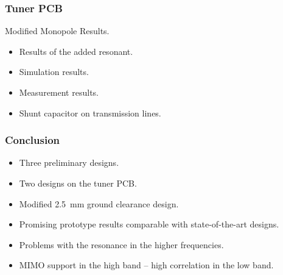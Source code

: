 \begin{frame}
  \frametitle{Tuner PCB}
    \begin{block}{Modified Monopole Results.}
      \begin{itemize}
      \item Results of the added resonant.
      \item Simulation results.
      \item Measurement results.
      \item Shunt capacitor on transmission lines.
      \end{itemize}
    \end{block}
\end{frame}

\begin{frame}
  \frametitle{Conclusion}
      \begin{itemize}
      \item Three preliminary designs.
      \item Two designs on the tuner PCB.
      \item Modified \SI{2.5}{mm} ground clearance design.
    \item Promising prototype results comparable with state-of-the-art designs.
    \item Problems with the resonance in the higher frequencies.
    \item MIMO support in the high band -- high correlation in the low band.
      \end{itemize}
\end{frame}


